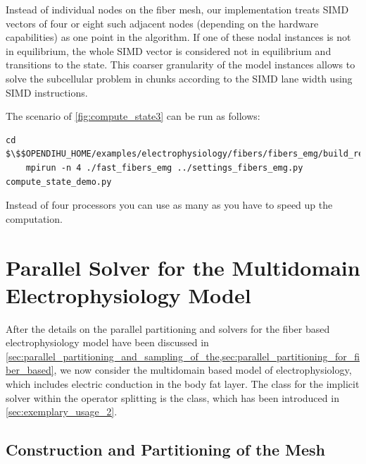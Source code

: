 Instead of individual nodes on the fiber mesh, our implementation treats SIMD vectors of four or eight such adjacent nodes (depending on the hardware capabilities) as one point in the algorithm.  If one of these nodal instances is not in equilibrium, the whole SIMD vector is considered not in equilibrium and transitions to the  state. This coarser granularity of the model instances allows to solve the subcellular problem in chunks according to the SIMD lane width using SIMD instructions.

\begin{reproduce_no_break}
  The scenario of \cref{fig:compute_state3} can be run as follows:
  \begin{lstlisting}[columns=fullflexible,breaklines=true,postbreak=\mbox{\textcolor{gray}{$\hookrightarrow$}\space}]
    cd $\$$OPENDIHU_HOME/examples/electrophysiology/fibers/fibers_emg/build_release
    mpirun -n 4 ./fast_fibers_emg ../settings_fibers_emg.py compute_state_demo.py
  \end{lstlisting}
  Instead of four processors you can use as many as you have to speed up the computation.
\end{reproduce_no_break}
\section{Parallel Solver for the Multidomain Electrophysiology Model}\label{sec:parallel_solver_multidomain}

After the details on the parallel partitioning and solvers for the fiber based electrophysiology model have been discussed in \cref{sec:parallel_partitioning_and_sampling_of_the,sec:parallel_partitioning_for_fiber_based}, we now consider the multidomain based model of electrophysiology, which includes electric conduction in the body fat layer. The class for the implicit solver within the operator splitting is the  class, which has been introduced in \cref{sec:exemplary_usage_2}.

\subsection{Construction and Partitioning of the Mesh}\label{sec:construction_and_partitioning_of_the_mesh}

